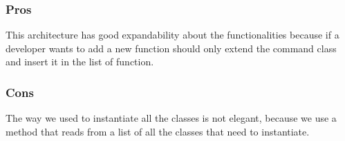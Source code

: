 \subsubsection{Pros}
This architecture has good expandability about the functionalities because if a developer wants to add a new function should only extend the command class and insert it in the list of function.
\subsubsection{Cons}
The way we used to instantiate all the classes is not elegant, because we use a method that reads from a list of all the classes that need to instantiate.
